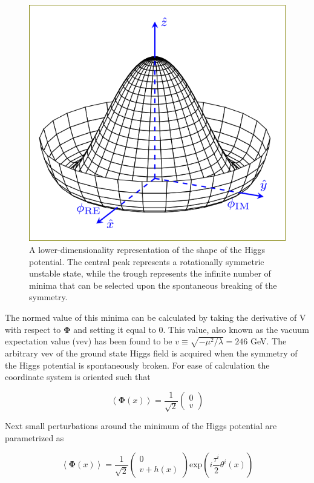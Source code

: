 \begin{figure}[!h]
  \begin{center}
    \includegraphics[width=0.4\linewidth]{figures/theory/higgs_potential.png}
    \caption{ A lower-dimensionality representation of the shape of the Higgs
potential.  The central peak represents a rotationally symmetric
unstable state, while the trough represents the infinite number of minima that
can be selected upon the spontaneous breaking of the symmetry.}
    \label{fig:higgs_potential}
  \end{center}
\end{figure}

The normed value of this minima can be calculated by taking the derivative of V
with respect to $\boldsymbol{\Phi}$ and setting it equal to $0$. This value,
also known as the vacuum expectation value (vev) has been found to be $v \equiv
\sqrt{-\mu^{2}/\lambda} = 246$ GeV. The arbitrary vev of the ground state Higgs
field is acquired when the symmetry of the Higgs potential is spontaneously
broken.  For ease of calculation the coordinate system is oriented such that

\begin{equation}
\left\langle \boldsymbol{\Phi}(x) \right\rangle = \frac{1}{\sqrt{2}} \left(
\begin{matrix} 0 \\ v \end{matrix} \right)
\end{equation} 

Next small perturbations around the minimum of the Higgs
potential are parametrized as 

\begin{equation} \label{eq:higgs:broken_higgs}
\left\langle \boldsymbol{\Phi}(x) \right\rangle = \frac{1}{\sqrt{2}} \left(
\begin{matrix} 0 \\ v + h(x) \end{matrix} \right) \text{exp} \left(
i\frac{\tau^{i}}{2}\theta^{i}(x) \right)
\end{equation} 

